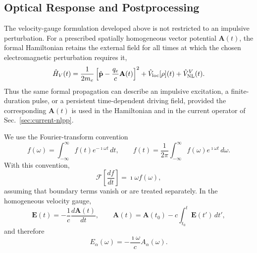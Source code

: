 \subsection{Optical Response and Postprocessing}
\label{sec:optical-response}

The velocity-gauge formulation developed above is not restricted to an
impulsive perturbation.  For a prescribed spatially homogeneous vector
potential $\mathbf A(t)$, the formal Hamiltonian retains the external
field for all times at which the chosen electromagnetic perturbation
requires it,
\begin{equation}
  \hat H_V(t)
  =
  \frac{1}{2m_e}
  \left[
    \hat{\mathbf p}
    -
    \frac{q_e}{c}\mathbf A(t)
  \right]^2
  + \hat V_{\rm loc}[\rho](t)
  + \hat V_{\rm NL}^{V}(t).
  \label{eq:optical_response_vg_hamiltonian}
\end{equation}
Thus the same formal propagation can describe an impulsive excitation,
a finite-duration pulse, or a persistent time-dependent driving field,
provided the corresponding $\mathbf A(t)$ is used in the Hamiltonian and
in the current operator of Sec.~\ref{sec:current-nlpp}.

We use the Fourier-transform convention
\begin{equation}
  f(\omega)
  =
  \int_{-\infty}^{\infty}
  f(t)e^{-\imath\omega t}\,dt,
  \qquad
  f(t)
  =
  \frac{1}{2\pi}
  \int_{-\infty}^{\infty}
  f(\omega)e^{\imath\omega t}\,d\omega .
  \label{eq:fourier_convention}
\end{equation}
With this convention,
\begin{equation}
  \mathcal F\!\left[
    \frac{df}{dt}
  \right]
  =
  \imath\omega f(\omega),
  \label{eq:fourier_derivative_convention}
\end{equation}
assuming that boundary terms vanish or are treated separately.  In the
homogeneous velocity gauge,
\begin{equation}
  \mathbf E(t)
  =
  -\frac{1}{c}\frac{d\mathbf A(t)}{dt},
  \qquad
  \mathbf A(t)
  =
  \mathbf A(t_0)
  -
  c\int_{t_0}^{t}\mathbf E(t')\,dt',
  \label{eq:e_a_time_relation_optical}
\end{equation}
and therefore
\begin{equation}
  E_\alpha(\omega)
  =
  -\frac{\imath\omega}{c}
  A_\alpha(\omega).
  \label{eq:e_a_frequency_relation_optical}
\end{equation}


